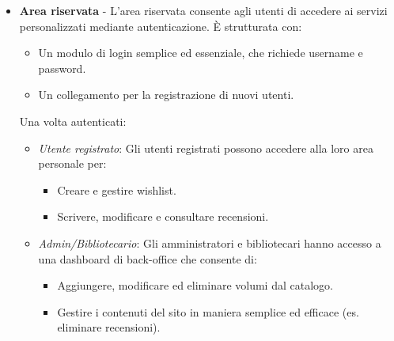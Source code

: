 \documentclass{article}
\begin{document}
\begin{itemize}
    \item \textbf{Area riservata} - L'area riservata consente agli utenti di accedere ai servizi personalizzati mediante autenticazione. È strutturata con:
        \begin{itemize}
            \item Un modulo di login semplice ed essenziale, che richiede username e password.
            \item Un collegamento per la registrazione di nuovi utenti.
        \end{itemize}
    Una volta autenticati:
        \begin{itemize}
            \item \emph{Utente registrato}: Gli utenti registrati possono accedere alla loro area personale per:
                \begin{itemize}
                    \item Creare e gestire wishlist.
                    \item Scrivere, modificare e consultare recensioni.
                \end{itemize}
            \item \emph{Admin/Bibliotecario}: Gli amministratori e bibliotecari hanno accesso a una dashboard di back-office che consente di:
                \begin{itemize}
                    \item Aggiungere, modificare ed eliminare volumi dal catalogo.
                    \item Gestire i contenuti del sito in maniera semplice ed efficace (es. eliminare recensioni).
                \end{itemize}
        \end{itemize}
\end{itemize}


\newpage
\end{document}
